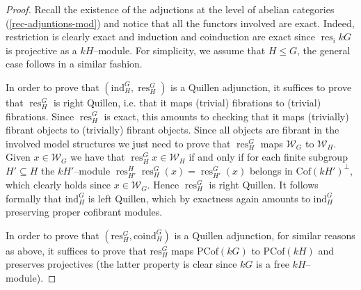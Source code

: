 \documentclass{amsart}
\newcommand{\GD}[1]{{\color{ForestGreen} G: [#1]}}
\newcommand{\res}{\operatorname{res}\nolimits}
\newcommand{\ind}{\operatorname{ind}\nolimits}
\def \C{{\mathcal C}}
\def \F{{\mathcal F}}
\def \S{{\mathcal S}}
\def \W{{\mathcal W}}
\def \Fin{{\mathcal{F}\textrm{in}}}
\def \Wfin{{\mathcal W}_{G}}
\DeclareMathOperator{\Cof}{Cof}
\numberwithin{equation}{section}%
\theoremstyle{remark}
\begin{document}
{
\begin{proof}
Recall the existence of the adjuctions at the level of abelian categories (\cref{rec-adjuntions-mod}) and notice that all the functors involved are exact. Indeed, restriction is clearly exact and induction and coinduction are exact since $\res_i kG$ is projective as a $kH$--module.  For simplicity, we assume that $H\leqslant G$, the general case follows in a similar fashion. 

In order to prove that $(\mathrm{ind}_H^G,\res_H^G)$ is a Quillen adjunction, it suffices to prove that $\res_H^G$ is right Quillen, i.e. that it maps (trivial) fibrations to (trivial) fibrations. Since $\res_H^G$ is exact, this amounts to checking that it maps (trivially) fibrant objects to (trivially) fibrant objects. Since all objects are fibrant in the involved model structures we just need to prove that $\res_H^G$ maps $\W_{G}$ to $\W_{H}$. Given $x\in\Wfin$ we have that $\res_H^Gx\in\W_{H}$ if and only if for each finite subgroup $H'\subseteq H$ the $kH'$--module $\res^{H}_{H'} \res^G_{H}(x)=\res^G_{H'}(x)$ belongs in $\mathrm{Cof}(kH')^\perp$, which clearly holds since $x\in\Wfin$. Hence $\res^G_H$ is right Quillen. It follows formally that $\mathrm{ind}^G_H$ is left Quillen, which by exactness again amounts to $\mathrm{ind}^G_H$ preserving proper cofibrant modules.

In order to prove that $(\mathrm{res}_H^G,\mathrm{coind}_H^G)$ is a Quillen adjunction, for similar reasons as above, it suffices to prove that $\mathrm{res}_H^G$ maps $\mathrm{PCof}(kG)$ to $\mathrm{PCof}(kH)$ and preserves projectives (the latter property is clear since $kG$ is a free $kH$--module).



    

\end{proof}}
\end{document}
